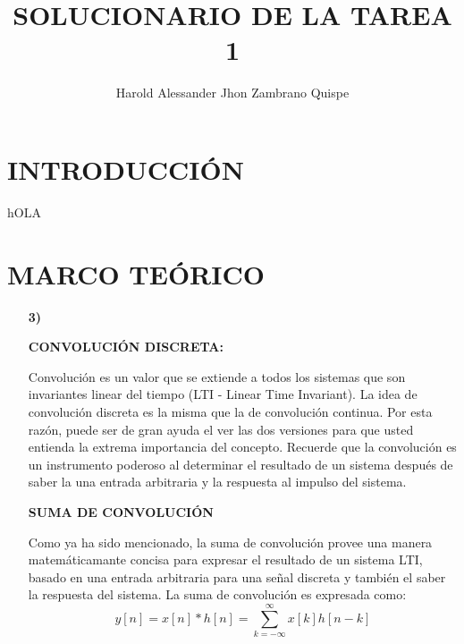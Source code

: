 \documentclass[11pt,a4paper]{article}
\author{Harold Alessander Jhon Zambrano Quispe}
\title{SOLUCIONARIO DE LA TAREA 1}
\begin{document}
   
   \section{{INTRODUCCIÓN}}{
	\large{
	hOLA

	}}
	\newpage
   \section{{MARCO TEÓRICO}}{
	\large{
	\begin{enumerate}
	\item[\textbf{3)}]
	\begin{flushleft}
\textbf{CONVOLUCI\'ON DISCRETA:}
\end{flushleft}
Convolución es un valor que se extiende a todos los sistemas que son invariantes linear del tiempo (LTI - Linear Time Invariant). La idea de convolución discreta es la misma que la de convolución continua. Por esta razón, puede ser de gran ayuda el ver las dos versiones para que usted entienda la extrema importancia del concepto. Recuerde que la convolución es un instrumento poderoso al determinar el resultado de un sistema después de saber la una entrada arbitraria y la respuesta al impulso del sistema. 
\begin{flushleft}
\textbf{SUMA DE CONVOLUCIÓN}
\end{flushleft}
Como ya ha sido mencionado, la suma de convolución provee una manera matemáticamante concisa para expresar el resultado de un sistema LTI, basado en una entrada arbitraria para una señal discreta y también el saber la respuesta del sistema. La suma de convolución es expresada como:
$$\boxed{y[n]=x[n]*h[n]=\sum_{k=-\infty}^{\infty}x[k]h[n-k]}$$
	\end{enumerate}
	}}
\newpage
\end{document}
